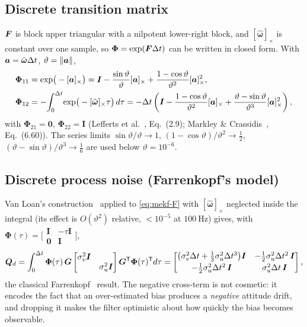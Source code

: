 \subsection{Discrete transition matrix}
$\bm{F}$ is block upper triangular with a nilpotent lower-right block, and $[\hat{\bm{\omega}}]_\times$
is constant over one sample, so $\bm{\Phi}=\exp(\bm{F}\Delta t)$ can be written in closed form. With
$\bm{a}=\hat{\bm{\omega}}\Delta t$, $\vartheta=\left\lVert \bm{a} \right\rVert$,
\begin{align}
\bm{\Phi}_{11} &= \exp\!\big(-[\bm{a}]_\times\big)
 = \bm{I} - \frac{\sin\vartheta}{\vartheta}[\bm{a}]_\times
  + \frac{1-\cos\vartheta}{\vartheta^2}[\bm{a}]_\times^2 ,
 \label{eq:mekf-phi11}\\
\bm{\Phi}_{12} &= -\!\int_0^{\Delta t}\!\exp\!\big(-[\hat{\bm{\omega}}]_\times\tau\big)\,d\tau
 = -\Delta t\left(\bm{I} - \frac{1-\cos\vartheta}{\vartheta^2}[\bm{a}]_\times
  + \frac{\vartheta-\sin\vartheta}{\vartheta^3}[\bm{a}]_\times^2\right),
 \label{eq:mekf-phi12}
\end{align}
with $\bm{\Phi}_{21}=\bm{0}$, $\bm{\Phi}_{22}=\bm{I}$ (Lefferts et al.~\cite{lefferts1982},
Eq.~(2.9); Markley \& Crassidis~\cite{markleycrassidis2014}, Eq.~(6.60)). The series limits
$\sin\vartheta/\vartheta\to1$, $(1-\cos\vartheta)/\vartheta^2\to\tfrac12$,
$(\vartheta-\sin\vartheta)/\vartheta^3\to\tfrac16$ are used below $\vartheta=10^{-6}$.

\subsection{Discrete process noise (Farrenkopf's model)}
Van Loan's construction~\cite{vanloan1978} applied to \eqref{eq:mekf-F} with
$[\hat{\bm{\omega}}]_\times$ neglected inside the integral (its effect is $O(\vartheta^2)$ relative,
$<10^{-5}$ at $\SI{100}{\hertz}$) gives, with $\bm{\Phi}(\tau)=\big[\begin{smallmatrix}\bm{I}&-\tau\bm{I}\\ \bm{0}&\bm{I}\end{smallmatrix}\big]$,
\begin{equation}
\bm{Q}_d=\int_0^{\Delta t}\bm{\Phi}(\tau)\,\bm{G}\begin{bmatrix}\sigma_v^2\bm{I}&\\&\sigma_u^2\bm{I}\end{bmatrix}\bm{G}^{\mathsf{T}}\bm{\Phi}(\tau)^{\mathsf{T}} d\tau
=\begin{bmatrix}
 \big(\sigma_v^2\Delta t+\tfrac13\sigma_u^2\Delta t^3\big)\bm{I} & -\tfrac12\sigma_u^2\Delta t^2\,\bm{I}\\[2pt]
 -\tfrac12\sigma_u^2\Delta t^2\,\bm{I} & \sigma_u^2\Delta t\,\bm{I}
\end{bmatrix},
\label{eq:mekf-Q}
\end{equation}
the classical Farrenkopf~\cite{farrenkopf1978} result. The negative cross-term is not cosmetic: it
encodes the fact that an over-estimated bias produces a \emph{negative} attitude drift, and dropping
it makes the filter optimistic about how quickly the bias becomes observable.

